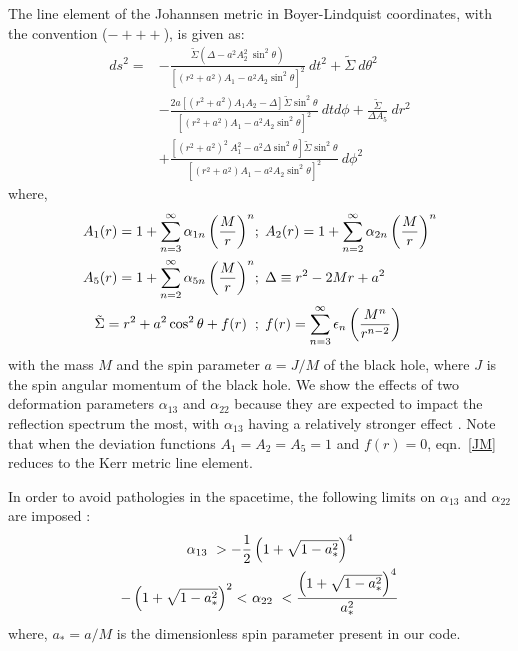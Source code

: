 \documentclass[aps,prd,twocolumn,superscriptaddress,nofootinbib,amsmath,amssymb]{revtex4-1}
\begin{document}
The line element of the Johannsen metric in Boyer-Lindquist coordinates, with the convention ($- + + +$), is given as:
\begin{align}
ds^2       =       &-\frac{\tilde{\Sigma}\left(\Delta - a^2 A_2^{2}~\sin^2\theta\right)}{\left[\left(r^2+a^2\right)A_1 - a^2A_2\sin^2\theta\right]^2}~dt^2 + \tilde{\Sigma} ~d\theta^2 \nonumber \\
                        &-\frac{2a\left[\left(r^2+a^2\right)A_1A_2 - \Delta\right]\tilde{\Sigma}\sin^2\theta}{\left[\left(r^2+a^2\right)A_1 - a^2A_2\sin^2\theta\right]^2}~dtd\phi + \frac{\tilde{\Sigma}}{\Delta A_5}~dr^2   \nonumber \\
                        &+ \frac{\left[\left(r^2+a^2\right)^2~A_1^{2} - a^2\Delta\sin^2\theta\right]\tilde{\Sigma}\sin^2\theta}{\left[\left(r^2+a^2\right)A_1 - a^2A_2\sin^2\theta\right]^2}~d\phi^2   \label{JM}
 \end{align}
where, 
\begin{align}                        
A_1(r) =  1 + \sum_{n=3}^{\infty} \alpha_{1n}\left(\frac{M}{r}\right)^n &; \hspace{1mm} A_2(r) = 1+ \sum_{n=2}^{\infty} \alpha_{2n}\left(\frac{M}{r}\right)^n   \nonumber \\ 
A_5(r) = 1+ \sum_{n=2}^{\infty} \alpha_{5n}\left(\frac{M}{r}\right)^n  &; \hspace{1mm} \Delta \equiv r^2-2Mr+a^2  \nonumber \\
\tilde{\Sigma} = r^2+a^2\cos^2\theta + f(r) \hspace{2mm} &; \hspace{1mm} f(r) = \sum_{n=3}^{\infty}\epsilon_n\left(\frac{M^n}{r^{n-2}}\right) \label{DEVS}
\end{align}
with the mass $M$ and the spin parameter $a =J/M$ of the black hole, where $J$ is the spin angular momentum of the black hole. We show the effects of two deformation parameters $\alpha_{13}$ and $\alpha_{22}$ because they are expected to impact the reflection spectrum the most, with $\alpha_{13}$ having a relatively stronger effect \citep{Bambi2017b}. Note that when the deviation functions $A_1=A_2=A_5=1$ and $f(r)=0$, eqn.~\ref{JM} reduces to the Kerr metric line element.

In order to avoid pathologies in the spacetime, the following limits on $\alpha_{13}$ and $\alpha_{22}$ are imposed \citep{Johannsen2013,Bambi2017b}:
\begin{align}
   \hspace{7mm} \alpha_{13} ~> -\frac{1}{2}&\left(1+\sqrt{1 - a_*^2}\right)^4 \label{13low} \\ 
    -\left(1+\sqrt{1 - a_*^2}\right)^2 < ~& \alpha_{22} ~< \frac{\left(1+\sqrt{1 - a_*^2}\right)^4}{a_*^2} \label{22}
\end{align} 
where, $a_* = a/M$ is the dimensionless spin parameter present in our code.
\end{document}
